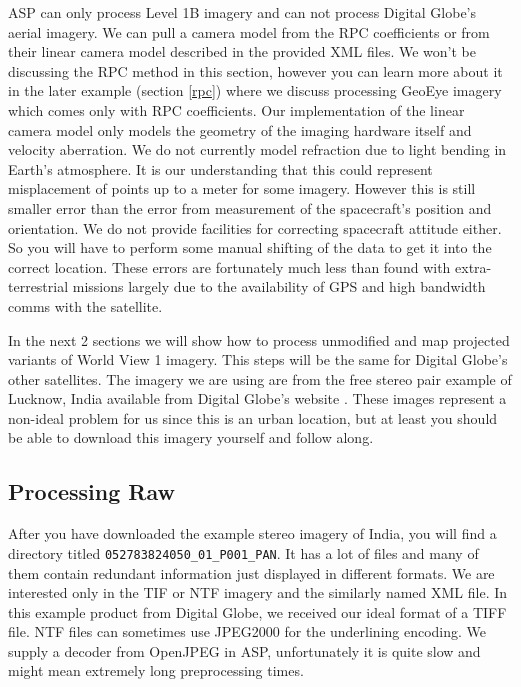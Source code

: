 ASP can only process Level 1B imagery and can not process Digital
Globe's aerial imagery. We can pull a camera model from the RPC
coefficients or from their linear camera model described in the
provided XML files. We won't be discussing the RPC method in this
section, however you can learn more about it in the later example (section \ref{rpc})
where we discuss processing GeoEye imagery which comes only with RPC
coefficients. Our implementation of the linear camera model only
models the geometry of the imaging hardware itself and velocity
aberration. We do not currently model refraction due to light bending
in Earth's atmosphere. It is our understanding that this could
represent misplacement of points up to a meter for some
imagery. However this is still smaller error than the error from
measurement of the spacecraft's position and orientation. We do not
provide facilities for correcting spacecraft attitude either. So you
will have to perform some manual shifting of the data to get it into
the correct location. These errors are fortunately much less than
found with extra-terrestrial missions largely due to the availability
of GPS and high bandwidth comms with the satellite.

In the next 2 sections we will show how to process unmodified and map
projected variants of World View 1 imagery. This steps will be the
same for Digital Globe's other satellites. The imagery we are using
are from the free stereo pair example of Lucknow, India available from
Digital Globe's website \cite{digital-globe:samples}. These images represent
a non-ideal problem for us since this is an urban location, but at
least you should be able to download this imagery yourself and follow
along.

\subsection{Processing Raw}
\label{rawdg}

After you have downloaded the example stereo imagery of India, you
will find a directory titled\newline
\texttt{052783824050\_01\_P001\_PAN}. It has a
lot of files and many of them contain redundant information just
displayed in different formats. We are interested only in the TIF or NTF
imagery and the similarly named XML file. In this example product from
Digital Globe, we received our ideal format of a TIFF file. NTF files
can sometimes use JPEG2000 for the underlining encoding. We supply a
decoder from OpenJPEG in ASP, unfortunately it is quite slow and might
mean extremely long preprocessing times.

